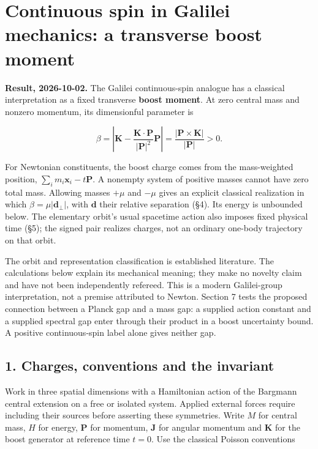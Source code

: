\documentclass[11pt,a4paper]{article}
\begin{document}
\hypertarget{continuous-spin-in-galilei-mechanics-a-transverse-boost-moment}{%
\section{Continuous spin in Galilei mechanics: a transverse boost
moment}\label{continuous-spin-in-galilei-mechanics-a-transverse-boost-moment}}

\textbf{Result, 2026-10-02.} The Galilei continuous-spin analogue has a
classical interpretation as a fixed transverse \textbf{boost moment}. At
zero central mass and nonzero momentum, its dimensionful parameter is

\[
\beta=\left|\mathbf K-\frac{\mathbf K\cdot\mathbf P}{|\mathbf P|^2}
\mathbf P\right|
=\frac{|\mathbf P\times\mathbf K|}{|\mathbf P|}>0. \tag{1}
\]

For Newtonian constituents, the boost charge comes from the
mass-weighted position, \(\sum_i m_i\mathbf x_i-t\mathbf P\). A nonempty
system of positive masses cannot have zero total mass. Allowing masses
\(+\mu\) and \(-\mu\) gives an explicit classical realization in which
\(\beta=\mu|\mathbf d_\perp|\), with \(\mathbf d\) their relative
separation (§4). Its energy is unbounded below. The elementary orbit's
usual spacetime action also imposes fixed physical time (§5); the signed
pair realizes charges, not an ordinary one-body trajectory on that
orbit.

The orbit and representation classification is established literature.
The calculations below explain its mechanical meaning; they make no
novelty claim and have not been independently refereed. This is a modern
Galilei-group interpretation, not a premise attributed to Newton.
Section 7 tests the proposed connection between a Planck gap and a mass
gap: a supplied action constant and a supplied spectral gap enter
through their product in a boost uncertainty bound. A positive
continuous-spin label alone gives neither gap.

\hypertarget{charges-conventions-and-the-invariant}{%
\subsection{1. Charges, conventions and the
invariant}\label{charges-conventions-and-the-invariant}}

Work in three spatial dimensions with a Hamiltonian action of the
Bargmann central extension on a free or isolated system. Applied
external forces require including their sources before asserting these
symmetries. Write \(M\) for central mass, \(H\) for energy,
\(\mathbf P\) for momentum, \(\mathbf J\) for angular momentum and
\(\mathbf K\) for the boost generator at reference time \(t=0\). Use the
classical Poisson conventions
\end{document}
